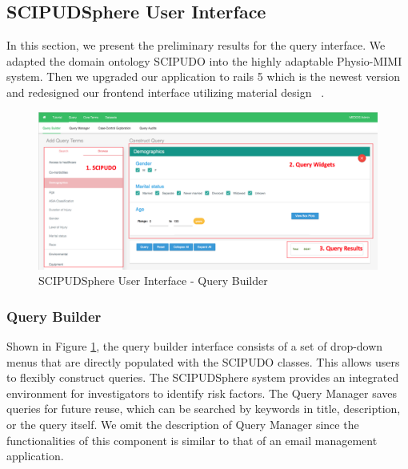 \documentclass{amia}
\begin{document}
\subsection{SCIPUDSphere User Interface}
In this section, we present the preliminary results for the query interface. We adapted the domain ontology SCIPUDO into the highly adaptable Physio-MIMI system. Then we upgraded our application to rails 5 which is the newest version and redesigned our frontend interface utilizing material design ~\cite{material}. 

\begin{figure}[h!]
  \centering
  \includegraphics[scale=0.4]{pics/interface.png}
  \caption{SCIPUDSphere User Interface - Query Builder}
  \label{interface}
\end{figure}

\subsubsection{Query Builder}
Shown in Figure \ref{interface}, the query builder interface consists of a set of drop-down menus that are directly populated with the SCIPUDO classes. This allows users to flexibly construct queries. The SCIPUDSphere system provides an integrated environment for investigators to identify risk factors. The Query Manager saves queries for future reuse, which can be searched by keywords in title, description, or the query itself. We omit the description of Query Manager since the functionalities of this component is similar to that of an email management application.
\end{document}
